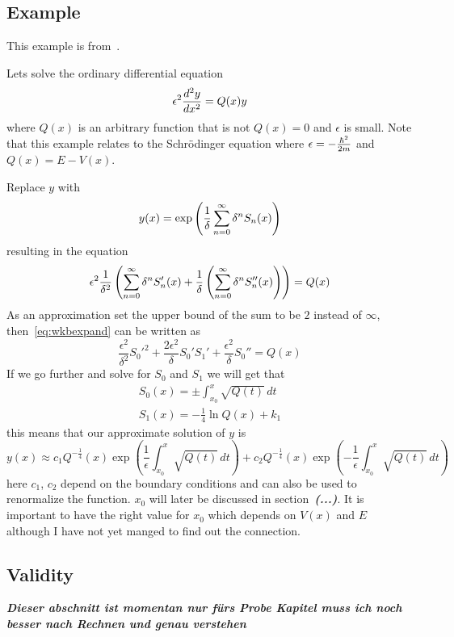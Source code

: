 \documentclass[11pt,DIV=10,final]{scrreprt} %
\begin{document}
\subsection{Example}
This example is from~\cite[An example]{wiki:wkb}.

Lets solve the ordinary differential equation
\[
  \epsilon^{2} {d^{2}y \over dx^{2}} = Q(x)y
\]
where $Q(x)$ is an arbitrary function that is not $Q(x) = 0$ and $\epsilon$ is small. Note that this example relates to the Schrödinger equation
where $\epsilon = -{\hbar^{2} \over 2m}$ and $Q(x) = E - V(x)$.

Replace $y$ with
\[
  y(x) = \exp \left({1 \over \delta} \sum_{n=0}^{\infty}{\delta^{n}S_{n}(x)}\right)
\]
resulting in the equation
\begin{equation}
\label{eq:wkbexpand}
  \epsilon^{2}{1 \over \delta^{2}}\left(\sum_{n=0}^{\infty}{\delta^{n}S'_{n}(x)} + {1 \over \delta}\left(\sum_{n=0}^{\infty}{\delta^{n}S''_{n}(x)}\right)\right) = Q(x)
\end{equation}
As an approximation set the upper bound of the sum to be $2$ instead of $\infty$, then~\ref{eq:wkbexpand} can be written as
\begin{equation}
\label{eq:wkbapprox}
 \frac{\epsilon^2}{\delta^2}S_0'^2 + \frac{2\epsilon^2}{\delta}S_0'S_1' + \frac{\epsilon^2}{\delta}S_0'' = Q(x)
\end{equation}
If we go further and solve for $S_{0}$ and $S_{1}$ we will get that
\begin{align}
	S_0(x) = \pm \int_{x_0}^x \sqrt{Q(t)}\,dt \\
	S_1(x) = -\frac{1}{4}\ln Q(x) + k_1
\end{align}
this means that our approximate solution of $y$ is
\[
y(x)\approx c_{1}Q^{-{\frac {1}{4}}}(x)\exp \left({\frac {1}{\epsilon }}\int _{x_{0}}^{x}{\sqrt {Q(t)}}\,dt\right)+c_{2}Q^{-{\frac {1}{4}}}(x)\exp \left(-{\frac {1}{\epsilon }}\int _{x_{0}}^{x}{\sqrt {Q(t)}}\,dt\right)
\]
here $c_{1}$, $c_{2}$ depend on the boundary conditions and can also be used to renormalize the function. $x_{0}$ will later be discussed in section~\textit{\textbf{(...)}}. It is important to have the right value for $x_{0}$ which depends on $V(x)$ and $E$ although I have not yet manged to find out the connection.

\subsection{Validity}
\label{meth:wkb:valid}
\textit{\textbf{Dieser abschnitt ist momentan nur fürs Probe Kapitel muss ich noch besser nach Rechnen und genau verstehen}}
\end{document}
